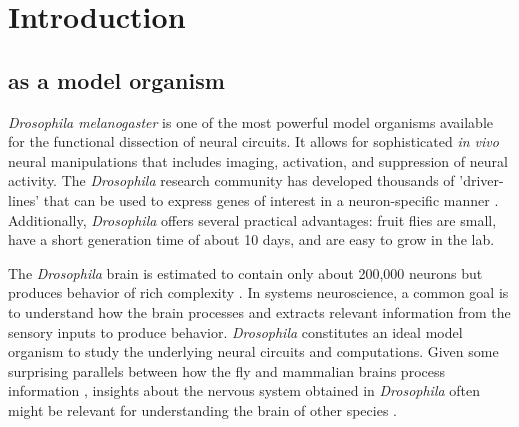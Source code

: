 \chapter{Introduction}
\label{chp:Introduction}


\section{\protect{} as a model organism}
\textit{Drosophila melanogaster} is one of the most powerful model organisms available for the functional dissection of neural circuits. It allows for sophisticated \textit{in vivo} neural manipulations that includes imaging, activation, and suppression of neural activity. The \textit{Drosophila} research community has developed thousands of 'driver-lines' that can be used to express genes of interest in a neuron-specific manner \parencite{Pfeiffer2008}. Additionally, \textit{Drosophila} offers several practical advantages: fruit flies are small, have a short generation time of about 10 days, and are easy to grow in the lab. 

The \textit{Drosophila} brain is estimated to contain only about 200,000 neurons \parencite{Raji2021} but produces behavior of rich complexity \parencite{Card2008, Pavlou2013, Ryu2022}. In systems neuroscience, a common goal is to understand how the brain processes and extracts relevant information from the sensory inputs to produce behavior. \textit{Drosophila} constitutes an ideal model organism to study the underlying neural circuits and computations. Given some surprising parallels between how the fly and mammalian brains process information \parencite{Borst2015}, insights about the nervous system obtained in \textit{Drosophila} often might be relevant for understanding the brain of other species \parencite{Bellen2010}.
